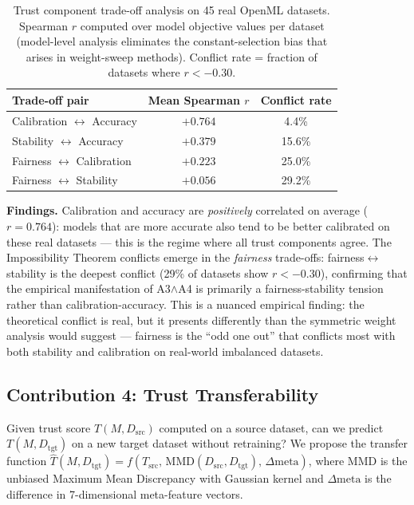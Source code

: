 \documentclass[10pt]{article}
\begin{document}
\begin{table}[h]
\centering
\caption{Trust component trade-off analysis on 45 real OpenML datasets.
Spearman $r$ computed over model objective values per dataset (model-level analysis eliminates the constant-selection bias that arises in weight-sweep methods).
Conflict rate = fraction of datasets where $r < -0.30$.}
\label{tab:pareto_paper}
\begin{tabular}{lcc}
\toprule
\textbf{Trade-off pair} & Mean Spearman $r$ & Conflict rate \\
\midrule
Calibration $\leftrightarrow$ Accuracy  & $+0.764$ & 4.4\%  \\
Stability $\leftrightarrow$ Accuracy    & $+0.379$ & 15.6\% \\
Fairness $\leftrightarrow$ Calibration  & $+0.223$ & 25.0\% \\
Fairness $\leftrightarrow$ Stability    & $+0.056$ & 29.2\% \\
\bottomrule
\end{tabular}
\end{table}

\textbf{Findings.} Calibration and accuracy are \emph{positively} correlated on average ($r{=}0.764$): models that are more accurate also tend to be better calibrated on these real datasets — this is the regime where all trust components agree. The Impossibility Theorem conflicts emerge in the \emph{fairness} trade-offs: fairness$\leftrightarrow$stability is the deepest conflict (29\% of datasets show $r{<}{-}0.30$), confirming that the empirical manifestation of A3$\wedge$A4 is primarily a fairness-stability tension rather than calibration-accuracy. This is a nuanced empirical finding: the theoretical conflict is real, but it presents differently than the symmetric weight analysis would suggest — fairness is the ``odd one out'' that conflicts most with both stability and calibration on real-world imbalanced datasets.

\subsection{Contribution 4: Trust Transferability}
\label{sec:transfer}

Given trust score $T(M, D_\text{src})$ computed on a source dataset, can we predict $T(M, D_\text{tgt})$ on a new target dataset without retraining? We propose the transfer function $\hat{T}(M, D_\text{tgt}) = f(T_\text{src},\, \text{MMD}(D_\text{src}, D_\text{tgt}),\, \Delta\text{meta})$, where MMD is the unbiased Maximum Mean Discrepancy with Gaussian kernel and $\Delta\text{meta}$ is the difference in 7-dimensional meta-feature vectors.
\end{document}

